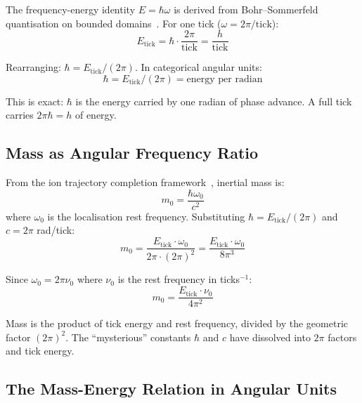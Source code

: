 \documentclass[twocolumn,10pt,a4paper]{article}
\theoremstyle{definition}
\theoremstyle{remark}
\begin{document}
The frequency-energy identity $E = \hbar\omega$ is derived from Bohr--Sommerfeld quantisation on bounded domains~\cite{sachikonye2025bounded}. For one tick ($\omega = 2\pi/\text{tick}$):
\begin{equation}
E_{\text{tick}} = \hbar \cdot \frac{2\pi}{\text{tick}} = \frac{h}{\text{tick}}
\label{eq:E_tick}
\end{equation}

Rearranging: $\hbar = E_{\text{tick}} / (2\pi)$. In categorical angular units:
\begin{equation}
\boxed{\hbar = E_{\text{tick}} / (2\pi) = \text{energy per radian}}
\label{eq:hbar_angular}
\end{equation}

This is exact: $\hbar$ is the energy carried by one radian of phase advance. A full tick carries $2\pi\hbar = h$ of energy.

\subsection{Mass as Angular Frequency Ratio}

From the ion trajectory completion framework~\cite{sachikonye2025ion}, inertial mass is:
\begin{equation}
m_0 = \frac{\hbar\omega_0}{c^2}
\label{eq:mass_from_ion}
\end{equation}
where $\omega_0$ is the localisation rest frequency. Substituting $\hbar = E_{\text{tick}}/(2\pi)$ and $c = 2\pi$ rad/tick:
\begin{equation}
m_0 = \frac{E_{\text{tick}} \cdot \omega_0}{2\pi \cdot (2\pi)^2} = \frac{E_{\text{tick}} \cdot \omega_0}{8\pi^3}
\label{eq:mass_angular}
\end{equation}

Since $\omega_0 = 2\pi\nu_0$ where $\nu_0$ is the rest frequency in ticks$^{-1}$:
\begin{equation}
\boxed{m_0 = \frac{E_{\text{tick}} \cdot \nu_0}{4\pi^2}}
\label{eq:mass_clean}
\end{equation}

Mass is the product of tick energy and rest frequency, divided by the geometric factor $(2\pi)^2$. The ``mysterious'' constants $\hbar$ and $c$ have dissolved into $2\pi$ factors and tick energy.

\subsection{The Mass-Energy Relation in Angular Units}
\end{document}
